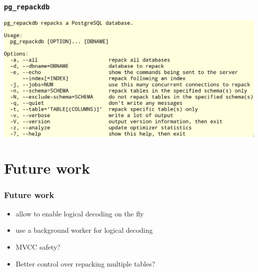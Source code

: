 \begin{frame}
  \frametitle{\texttt{pg\_repackdb}}

    \includegraphics[height=\sizeforimages\textheight]{repackdb.png}
\end{frame}

\section{Future work}

\begin{frame}
  \frametitle{Future work}
  \begin{itemize}
    \item allow to enable logical decoding on the fly
    \item use a background worker for logical decoding
    \item MVCC safety?
    \item Better control over repacking multiple tables?
  \end{itemize}
\end{frame}
